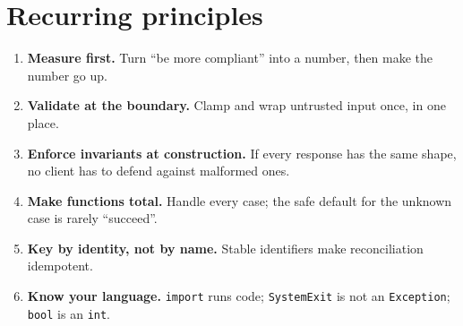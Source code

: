 \documentclass[11pt,a4paper]{article}
\newcommand{\code}[1]{\texttt{#1}}
\begin{document}
\section{Recurring principles}
\begin{enumerate}[leftmargin=2em]
  \item \textbf{Measure first.} Turn ``be more compliant'' into a number, then
        make the number go up.
  \item \textbf{Validate at the boundary.} Clamp and wrap untrusted input once,
        in one place.
  \item \textbf{Enforce invariants at construction.} If every response has the
        same shape, no client has to defend against malformed ones.
  \item \textbf{Make functions total.} Handle every case; the safe default for
        the unknown case is rarely ``succeed''.
  \item \textbf{Key by identity, not by name.} Stable identifiers make
        reconciliation idempotent.
  \item \textbf{Know your language.} \code{import} runs code; \code{SystemExit}
        is not an \code{Exception}; \code{bool} is an \code{int}.
\end{enumerate}

\end{document}
